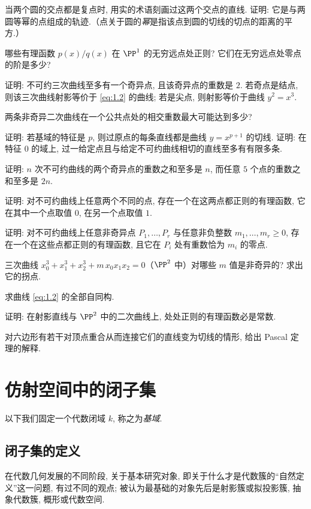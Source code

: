 \begin{compactenum}
	\item 当两个圆的交点都是复点时, 用实的术语刻画过这两个交点的直线. 证明: 它是与两圆等幂的点组成的轨迹.（点关于圆的\emph{幂}是指该点到圆的切线的切点的距离的平方.）
	\item 哪些有理函数 $p(x)/q(x)$ 在 $\PP^1$ 的无穷远点处正则? 它们在无穷远点处零点的阶是多少?
	\item 证明: 不可约三次曲线至多有一个奇异点, 且该奇异点的重数是 $2$. 若奇点是结点, 则该三次曲线射影等价于 \eqref{eq:1.2} 的曲线; 若是尖点, 则射影等价于曲线 $y^2 = x^3$.
	\item 两条非奇异二次曲线在一个公共点处的相交重数最大可能达到多少?
	\item 证明: 若基域的特征是 $p$, 则过原点的每条直线都是曲线 $y = x^{p+1}$ 的切线. 证明: 在特征 $0$ 的域上, 过一给定点且与给定不可约曲线相切的直线至多有有限多条.
	\item 证明: $n$ 次不可约曲线的两个奇异点的重数之和至多是 $n$, 而任意 $5$ 个点的重数之和至多是 $2n$.
	\item 证明: 对不可约曲线上任意两个不同的点, 存在一个在这两点都正则的有理函数, 它在其中一个点取值 $0$, 在另一个点取值 $1$.
	\item 证明: 对不可约曲线上任意非奇异点 $P_1, \ldots, P_r$ 与任意非负整数 $m_1, \ldots, m_r \ge 0$, 存在一个在这些点都正则的有理函数, 且它在 $P_i$ 处有重数恰为 $m_i$ 的零点.
	\item 三次曲线 $x_0^3 + x_1^3 + x_2^3 + m\, x_0 x_1 x_2 = 0$（$\PP^2$ 中）对哪些 $m$ 值是非奇异的? 求出它的拐点.
	\item 求曲线 \eqref{eq:1.2} 的全部自同构.
	\item 证明: 在射影直线与 $\PP^2$ 中的二次曲线上, 处处正则的有理函数必是常数.
	\item 对六边形有若干对顶点重合从而连接它们的直线变为切线的情形, 给出 Pascal 定理的解释.
\end{compactenum}

\section{仿射空间中的闭子集}

以下我们固定一个代数闭域 $k$, 称之为\emph{基域}.

\subsection{闭子集的定义}

在代数几何发展的不同阶段, 关于基本研究对象, 即关于什么才是代数簇的``自然定义''这一问题, 有过不同的观点; 被认为最基础的对象先后是射影簇或拟投影簇, 抽象代数簇, 概形或代数空间.

